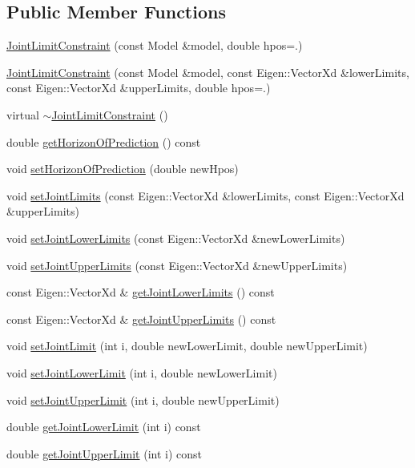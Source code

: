 \subsection*{Public Member Functions}
\begin{DoxyCompactItemize}
\item 
\hyperlink{classocra_1_1JointLimitConstraint_af81ce81f8c90e5bf4272cc6ab592ae69}{Joint\+Limit\+Constraint} (const Model \&model, double hpos=.)
\item 
\hyperlink{classocra_1_1JointLimitConstraint_a8e767f982c1d41192b03a0aafbd3ced5}{Joint\+Limit\+Constraint} (const Model \&model, const Eigen\+::\+Vector\+Xd \&lower\+Limits, const Eigen\+::\+Vector\+Xd \&upper\+Limits, double hpos=.)
\item 
virtual \hyperlink{classocra_1_1JointLimitConstraint_a5cb58e4dd8fe8c313a50e8601306e0dd}{$\sim$\+Joint\+Limit\+Constraint} ()
\item 
double \hyperlink{classocra_1_1JointLimitConstraint_af7d78cabe18ed94eb2f2efa61efa8516}{get\+Horizon\+Of\+Prediction} () const
\item 
void \hyperlink{classocra_1_1JointLimitConstraint_a6903c0e8ea1024dd050b604e741634a6}{set\+Horizon\+Of\+Prediction} (double new\+Hpos)
\item 
void \hyperlink{classocra_1_1JointLimitConstraint_ab2dcfcc6420510ddc291dbae83e38c40}{set\+Joint\+Limits} (const Eigen\+::\+Vector\+Xd \&lower\+Limits, const Eigen\+::\+Vector\+Xd \&upper\+Limits)
\item 
void \hyperlink{classocra_1_1JointLimitConstraint_a1ef49a88ac2646a45bac289a9b623b8f}{set\+Joint\+Lower\+Limits} (const Eigen\+::\+Vector\+Xd \&new\+Lower\+Limits)
\item 
void \hyperlink{classocra_1_1JointLimitConstraint_ad019e751fdb343ea0bd29efab8f4d5d2}{set\+Joint\+Upper\+Limits} (const Eigen\+::\+Vector\+Xd \&new\+Upper\+Limits)
\item 
const Eigen\+::\+Vector\+Xd \& \hyperlink{classocra_1_1JointLimitConstraint_a207e245abf812538eacf10fb9d9e704d}{get\+Joint\+Lower\+Limits} () const
\item 
const Eigen\+::\+Vector\+Xd \& \hyperlink{classocra_1_1JointLimitConstraint_a5055bb2f327a4fef0b43a3e92309e16f}{get\+Joint\+Upper\+Limits} () const
\item 
void \hyperlink{classocra_1_1JointLimitConstraint_a774667152d3cd376ef3101a4db889c3f}{set\+Joint\+Limit} (int i, double new\+Lower\+Limit, double new\+Upper\+Limit)
\item 
void \hyperlink{classocra_1_1JointLimitConstraint_abeac7915f147b24c8afd43ba44ce000c}{set\+Joint\+Lower\+Limit} (int i, double new\+Lower\+Limit)
\item 
void \hyperlink{classocra_1_1JointLimitConstraint_a4dd11a29e4ba9655efa588292335559d}{set\+Joint\+Upper\+Limit} (int i, double new\+Upper\+Limit)
\item 
double \hyperlink{classocra_1_1JointLimitConstraint_a4140ce4adf0c699b65ab1f9d33b4d487}{get\+Joint\+Lower\+Limit} (int i) const
\item 
double \hyperlink{classocra_1_1JointLimitConstraint_af08f9fe570f139055dc609e34d44e062}{get\+Joint\+Upper\+Limit} (int i) const
\end{DoxyCompactItemize}
